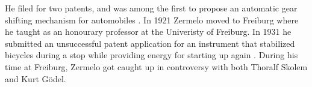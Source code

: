 \documentclass[../../../include/open-logic-section]{subfiles}
\begin{document}
 He filed for two patents, and was among the first to propose an automatic gear shifting
 mechanism for automobiles \citep[155]{ebbinghaus2015}.
  In 1921 Zermelo moved to Freiburg where he taught as an honourary professor
  at the Univeristy of Freiburg. In 1931 he submitted an unsuccessful patent application
  for an instrument that stabilized bicycles during a stop while providing energy for
  starting up again \citep[154]{ebbinghaus2015}. During his time at Freiburg, Zermelo
  got caught up in controversy with both Thoralf Skolem and Kurt G\"{o}del. 
\end{document}
